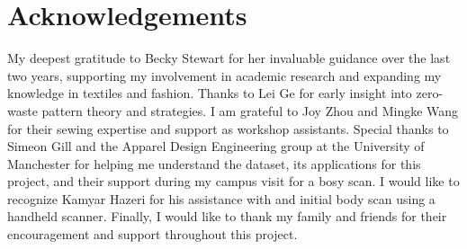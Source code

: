\chapter*{Acknowledgements}
My deepest gratitude to Becky Stewart for her invaluable guidance over the last two years, supporting my involvement in academic research and expanding my knowledge in textiles and fashion. Thanks to Lei Ge for early insight into zero-waste pattern theory and strategies. I am grateful to Joy Zhou and Mingke Wang for their sewing expertise and support as workshop assistants. Special thanks to Simeon Gill and the Apparel Design Engineering group at the University of Manchester for helping me understand the dataset, its applications for this project, and their support during my campus visit for a bosy scan. I would like to recognize Kamyar Hazeri for his assistance with and initial body scan using a handheld scanner. Finally, I would like to thank my family and friends for their encouragement and support throughout this project.